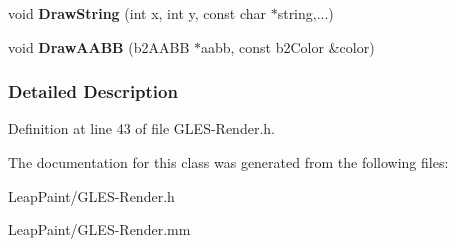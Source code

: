 \begin{DoxyCompactItemize}
\item 
\hypertarget{class_g_l_e_s_debug_draw_a16aaca99009b9423fe288b5815c8dbcf}{void {\bfseries Draw\-String} (int x, int y, const char $\ast$string,...)}\label{d7/da9/class_g_l_e_s_debug_draw_a16aaca99009b9423fe288b5815c8dbcf}

\item 
\hypertarget{class_g_l_e_s_debug_draw_a6dc5d6adbc8279c9d378311b66ddcf53}{void {\bfseries Draw\-A\-A\-B\-B} (b2\-A\-A\-B\-B $\ast$aabb, const b2\-Color \&color)}\label{d7/da9/class_g_l_e_s_debug_draw_a6dc5d6adbc8279c9d378311b66ddcf53}

\end{DoxyCompactItemize}


\subsubsection{Detailed Description}


Definition at line 43 of file G\-L\-E\-S-\/\-Render.\-h.



The documentation for this class was generated from the following files\-:\begin{DoxyCompactItemize}
\item 
Leap\-Paint/G\-L\-E\-S-\/\-Render.\-h\item 
Leap\-Paint/G\-L\-E\-S-\/\-Render.\-mm\end{DoxyCompactItemize}
